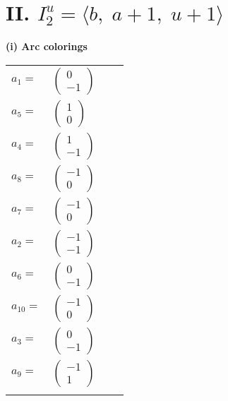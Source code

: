 \documentclass[1p]{elsarticle_modified}
\theoremstyle{definition}
\begin{document}
\centering \section*{II. $I^u_{2}= \langle b,\;a+1,\;u+1 \rangle$}
\flushleft \textbf{(i) Arc colorings}\\
\begin{tabular}{m{7pt} m{180pt} m{7pt} m{180pt} }
\flushright $a_{1}=$&$\begin{pmatrix}0\\-1\end{pmatrix}$ \\
\flushright $a_{5}=$&$\begin{pmatrix}1\\0\end{pmatrix}$ \\
\flushright $a_{4}=$&$\begin{pmatrix}1\\-1\end{pmatrix}$ \\
\flushright $a_{8}=$&$\begin{pmatrix}-1\\0\end{pmatrix}$ \\
\flushright $a_{7}=$&$\begin{pmatrix}-1\\0\end{pmatrix}$ \\
\flushright $a_{2}=$&$\begin{pmatrix}-1\\-1\end{pmatrix}$ \\
\flushright $a_{6}=$&$\begin{pmatrix}0\\-1\end{pmatrix}$ \\
\flushright $a_{10}=$&$\begin{pmatrix}-1\\0\end{pmatrix}$ \\
\flushright $a_{3}=$&$\begin{pmatrix}0\\-1\end{pmatrix}$ \\
\flushright $a_{9}=$&$\begin{pmatrix}-1\\1\end{pmatrix}$\\&\end{tabular}
\end{document}
